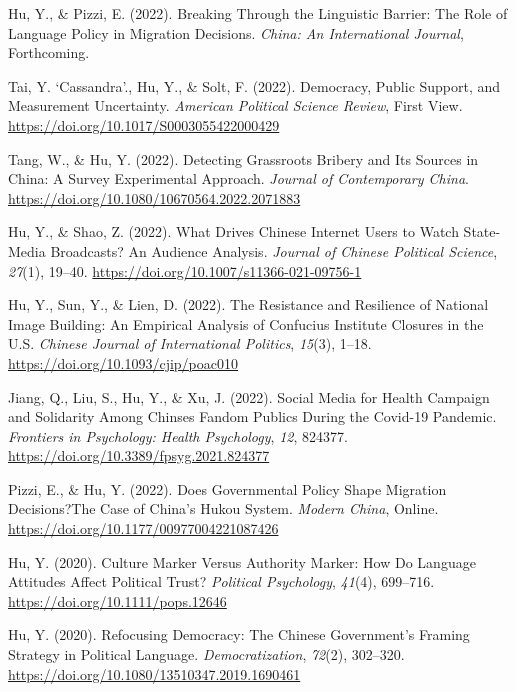 \documentclass[11pt,a4paper,]{awesome-cv}
\begin{document}
\leavevmode{}%
Hu, Y., \& Pizzi, E. (2022). Breaking Through the Linguistic Barrier:
The Role of Language Policy in Migration Decisions. \emph{China: An
International Journal}, Forthcoming.

\leavevmode{}%
Tai, Y. `Cassandra'., Hu, Y., \& Solt, F. (2022). Democracy, Public
Support, and Measurement Uncertainty. \emph{American Political Science
Review}, First View. \url{https://doi.org/10.1017/S0003055422000429}

\leavevmode{}%
Tang, W., \& Hu, Y. (2022). Detecting Grassroots Bribery and Its Sources
in China: A Survey Experimental Approach. \emph{Journal of Contemporary
China}. \url{https://doi.org/10.1080/10670564.2022.2071883}

\leavevmode{}%
Hu, Y., \& Shao, Z. (2022). What Drives Chinese Internet Users to Watch
State-Media Broadcasts? An Audience Analysis. \emph{Journal of Chinese
Political Science}, \emph{27}(1), 19--40.
\url{https://doi.org/10.1007/s11366-021-09756-1}

\leavevmode{}%
Hu, Y., Sun, Y., \& Lien, D. (2022). The Resistance and Resilience of
National Image Building: An Empirical Analysis of Confucius Institute
Closures in the U.S. \emph{Chinese Journal of International Politics},
\emph{15}(3), 1--18. \url{https://doi.org/10.1093/cjip/poac010}

\leavevmode{}%
Jiang, Q., Liu, S., Hu, Y., \& Xu, J. (2022). Social Media for Health
Campaign and Solidarity Among Chinses Fandom Publics During the Covid-19
Pandemic. \emph{Frontiers in Psychology: Health Psychology}, \emph{12},
824377. \url{https://doi.org/10.3389/fpsyg.2021.824377}

\leavevmode{}%
Pizzi, E., \& Hu, Y. (2022). Does Governmental Policy Shape Migration
Decisions?The Case of China's Hukou System. \emph{Modern China}, Online.
\url{https://doi.org/10.1177/00977004221087426}

\leavevmode{}%
Hu, Y. (2020). Culture Marker Versus Authority Marker: How Do Language
Attitudes Affect Political Trust? \emph{Political Psychology},
\emph{41}(4), 699--716. \url{https://doi.org/10.1111/pops.12646}

\leavevmode{}%
Hu, Y. (2020). Refocusing Democracy: The Chinese Government's Framing
Strategy in Political Language. \emph{Democratization}, \emph{72}(2),
302--320. \url{https://doi.org/10.1080/13510347.2019.1690461}
\end{document}
